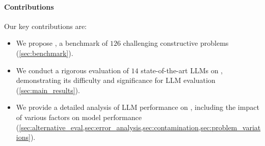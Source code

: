 \paragraph{Contributions}

Our key contributions are:
\vspace{-2mm}
\begin{itemize}[leftmargin=15pt]\setlength\itemsep{0.01em}
    \item We propose \mc, a benchmark of $126$ challenging constructive problems (\cref{sec:benchmark}).
    \item We conduct a rigorous evaluation of $14$ state-of-the-art LLMs on \mc, demonstrating its difficulty and significance for LLM evaluation (\cref{sec:main_results}).
    \item We provide a detailed analysis of LLM performance on \mc, including the impact of various factors on model performance (\cref{sec:alternative_eval,sec:error_analysis,sec:contamination,sec:problem_variations}).
\end{itemize}
\vspace{-2mm}
